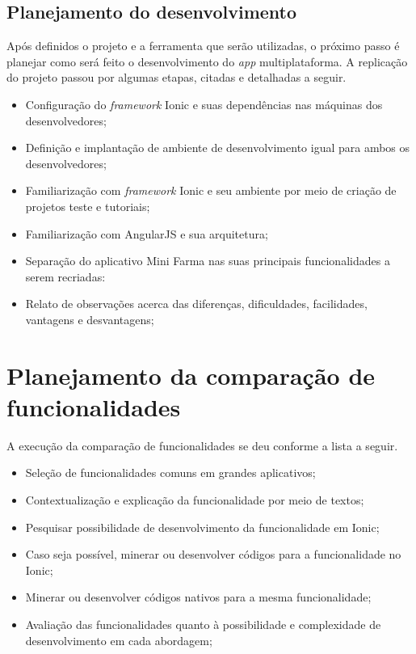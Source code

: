 \subsection{Planejamento do desenvolvimento} \label{subsection:planejamentodesenvolvimento}

Após definidos o projeto e a ferramenta que serão utilizadas, o próximo passo é planejar como será feito o desenvolvimento do \textit{app} multiplataforma. 
A replicação do projeto passou por algumas etapas, citadas e detalhadas a seguir.

\begin{itemize}
    \item Configuração do \textit{framework} Ionic e suas dependências nas máquinas dos desenvolvedores;
    \item Definição e implantação de ambiente de desenvolvimento igual para ambos os desenvolvedores;
    \item Familiarização com \textit{framework} Ionic e seu ambiente por meio de criação de projetos teste e tutoriais;
    \item Familiarização com AngularJS e sua arquitetura; 
    \item Separação do aplicativo Mini Farma nas suas principais funcionalidades a serem recriadas:
    \item Relato de observações acerca das diferenças, dificuldades, facilidades, vantagens e desvantagens;
\end{itemize}

\section{Planejamento da comparação de funcionalidades} \label{section:planejamentocomparacao}
A execução da comparação de funcionalidades se deu conforme a lista a seguir.

\begin{itemize}
    \item Seleção de funcionalidades comuns em grandes aplicativos;
    \item Contextualização e explicação da funcionalidade por meio de textos;
    \item Pesquisar possibilidade de desenvolvimento da funcionalidade em Ionic;
    \item Caso seja possível, minerar ou desenvolver códigos para a funcionalidade no Ionic;
    \item Minerar ou desenvolver códigos nativos para a mesma funcionalidade;
    \item Avaliação das funcionalidades quanto à possibilidade e complexidade de desenvolvimento em cada abordagem;
\end{itemize}

